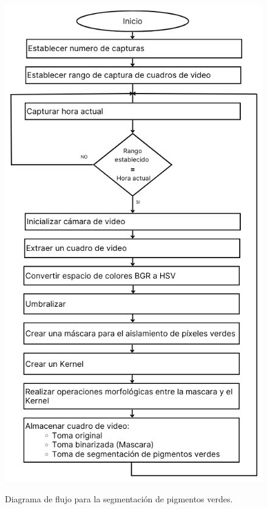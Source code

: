  \begin{figure}[H]
\centering
         \includegraphics[scale=0.65]{imgs/FlujoSeg4.png} \\
    \caption{Diagrama de flujo para la segmentación de pigmentos verdes.}\label{flujoseg}
\end{figure}

